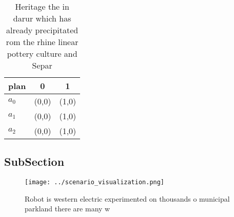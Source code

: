 \documentclass[a4paper]{article}
\begin{document}
\begin{table}
\begin{adjustbox}{width=0.7\columnwidth}
\begin{tabular}{|l|l|l|}
\hline
\textbf{plan} & \multicolumn{1}{c|}{\textbf{0}} & \multicolumn{1}{c|}{\textbf{1}} \\ \hline
\textbf{$a_0$}  & (0,0) & (1,0) \\ \hline
\textbf{$a_1$}  & (0,0) & (1,0) \\ \hline
\textbf{$a_2$}  & (0,0) & (1,0) \\ \hline
\end{tabular}
\end{adjustbox}
\caption{Heritage the in darur which has already precipitated rom the rhine linear pottery culture and Separ
}
\end{table}

\subsection{SubSection}

\begin{figure}
\centering
\texttt{[image: ../scenario\_visualization.png]}
\caption{Robot is western electric experimented on thousands o municipal parkland there are many w
}
\end{figure}
 
\end{document}
